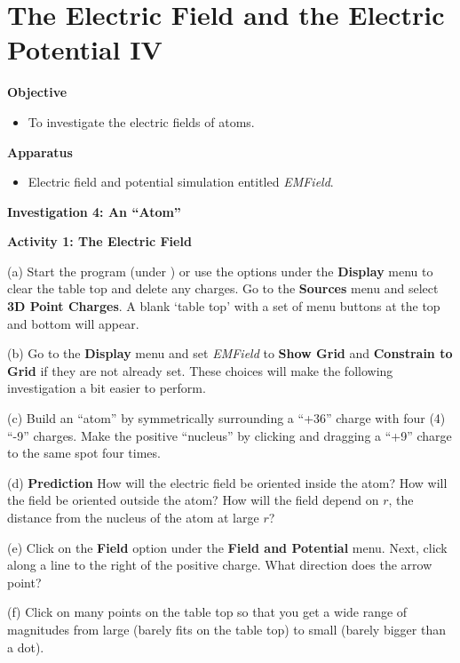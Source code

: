 
\section{The Electric Field and the Electric Potential IV}

\makelabheader %

\textbf{Objective}

\begin{itemize}
\item To investigate the electric fields of atoms.
\end{itemize}

\textbf{Apparatus}

\begin{itemize}
\item Electric field and potential simulation entitled {\it EMField}.
\end{itemize}

\textbf{Investigation 4: An {}``Atom''}

\textbf{Activity 1: The Electric Field}

(a) Start the program  (under ) or use the options under the 
\textbf{Display} menu to clear the table top and delete any charges.
Go to the \textbf{Sources} menu and select \textbf{3D Point Charges}.
A blank `table top' with a set of menu 
buttons at the top and bottom will appear.

(b) Go to the {\bf Display} menu and set {\it EMField} to
{\bf Show Grid} and {\bf Constrain to Grid} if they are not already set.
These choices will make the following investigation a bit easier to perform.

(c) Build an {}``atom'' by symmetrically surrounding
a {}``+36'' charge with four (4) {}``-9'' charges.
Make the positive ``nucleus'' by clicking and dragging a ``+9'' charge
to the same spot four times.


(d) {\bf Prediction} How will the electric field be oriented inside the atom?
How will the field be oriented outside the atom?
How will the field depend on $r$, the distance from the nucleus of the atom
at large $r$?
\answerspace{25mm}

(e) Click on the \textbf{Field} option under the \textbf{Field and Potential} menu.
Next, click along a line to the right of the positive charge.
What direction does the arrow point?
\answerspace{15mm}

(f) Click on many points on the table top so that you get a wide range of magnitudes from large
(barely fits on the table top) to small (barely bigger than a dot).

